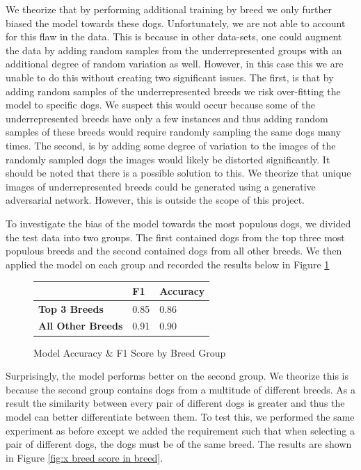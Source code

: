 \documentclass{article}
\begin{document}
We theorize that by performing additional training by breed we only further biased the model towards these dogs.  Unfortunately, we are not able to account for this flaw in the data.  This is because in other data-sets, one could augment the data by adding random samples from the underrepresented groups with an additional degree of random variation as well.  However, in this case this we are unable to do this without creating two significant issues.  The first, is that by adding random samples of the underrepresented breeds we risk over-fitting the model to specific dogs.  We suspect this would occur because some of the underrepresented breeds have only a few instances and thus adding random samples of these breeds would require randomly sampling the same dogs many times.  The second, is by adding some degree of variation to the images of the randomly sampled dogs the images would likely be distorted significantly.  It should be noted that there is a possible solution to this.  We theorize that unique images of underrepresented breeds could be generated using a generative adversarial network.  However, this is outside the scope of this project.

To investigate the bias of the model towards the most populous dogs, we divided the test data into two groups.  The first contained dogs from the top three most populous breeds and the second contained dogs from all other breeds.  We then applied the model on each group and recorded the results below in Figure \ref{fig:x breed score}


\newpage

\begin{figure}[]

\begin{center}

\begin{tabular}{|l|l|l|}
\hline
                          & \textbf{F1} & \textbf{Accuracy} \\ \hline
\textbf{Top 3 Breeds}     & 0.85        & 0.86              \\ \hline
\textbf{All Other Breeds} & 0.91        & 0.90              \\ \hline
\end{tabular}
\end{center}


\caption{Model Accuracy \& F1 Score by Breed Group}
\label{fig:x breed score}
\end{figure}

\noindent Surprisingly, the model performs better on the second group.  We theorize this is because the second group contains dogs from a multitude of different breeds.   As a result the similarity between every pair of different dogs is greater and thus the model can better differentiate between them.  To test this, we performed the same experiment as before except we added the requirement such that when selecting a pair of different dogs, the dogs must be of the same breed.  The results are shown in Figure \ref{fig:x breed score in breed}.
\end{document}
